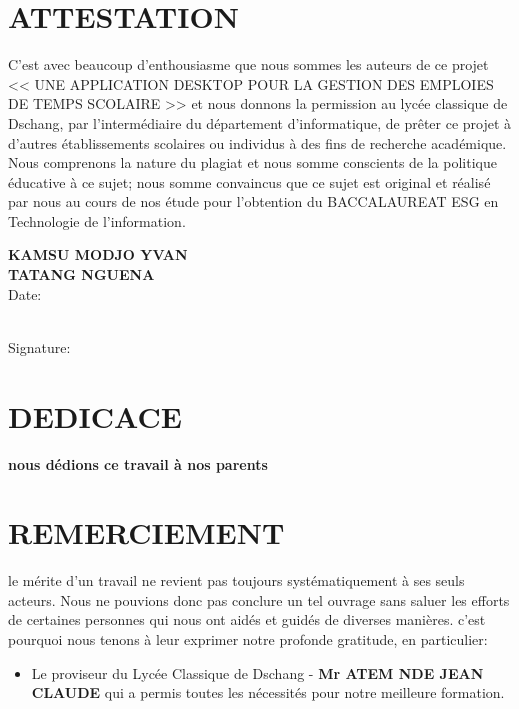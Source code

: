 \documentclass[english,12pt,a4paper]{report}
\begin{document}
\begin{spacing}{1.5}
\chapter*{ATTESTATION}
\hspace{1.2cm}
C'est avec beaucoup d'enthousiasme que nous sommes les auteurs de ce projet << UNE APPLICATION DESKTOP POUR LA GESTION DES EMPLOIES DE TEMPS SCOLAIRE >> et nous donnons la permission au lycée classique de Dschang, par l'intermédiaire du département d'informatique, de prêter ce projet à d'autres établissements scolaires ou individus à des fins de recherche académique. Nous comprenons la nature du plagiat et nous somme conscients de la politique éducative à ce sujet; nous somme convaincus que ce sujet est original et réalisé par nous au cours de nos étude pour l'obtention du BACCALAUREAT ESG en Technologie de l'information.
\begin{center}
\vspace{1cm}
\vspace{0.2cm}
\textbf{KAMSU MODJO YVAN}\\
\textbf{TATANG NGUENA}\\
\vspace{0.2cm}
Date:
\\
\vspace{0.2cm}
Signature:
\end{center}
{}
\chapter*{DEDICACE}
\hspace{1.2cm} 
\begin{center}
	\textbf{nous dédions ce travail à nos parents}
\end{center}
\vspace{-1.5cm}
\chapter*{REMERCIEMENT}
\vspace{-1.5cm}
\hspace{1.cm}
le mérite d'un travail ne revient pas toujours systématiquement à ses seuls acteurs. Nous ne pouvions donc pas conclure un tel ouvrage sans saluer les efforts de certaines personnes qui nous ont aidés et guidés de diverses manières. c'est pourquoi nous tenons à leur exprimer notre profonde gratitude, en particulier:
\begin{itemize}[label=\textbullet, font=\LARGE %
	]
	\item Le proviseur du Lycée Classique de Dschang - \textbf{Mr ATEM NDE JEAN CLAUDE} qui a permis toutes les nécessités pour notre meilleure formation.
	

\end{itemize}
\end{spacing}
\end{document}
